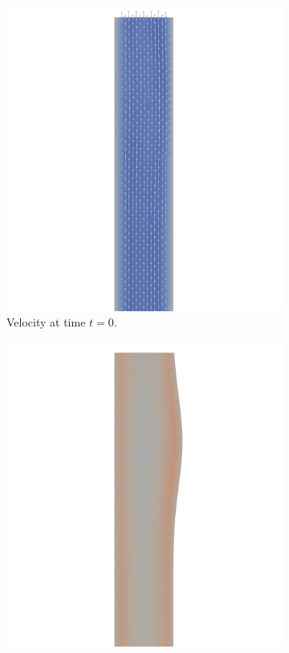 \documentclass[a4paper,11pt,oneside]{book}
\begin{document}
\begin{figure}[h!] 
  \begin{subfigure}[b]{0.5\linewidth}
    \centering
    \includegraphics[width=1.2\linewidth]{images/velocity_30_0.png} 
        \centering
    \caption{Velocity at time $t = 0$.} 
    \label{fig2:a} 
    \vspace{4ex}
  \end{subfigure}%
  \begin{subfigure}[b]{0.5\linewidth}
    \centering
    \includegraphics[width=1.2\linewidth]{images/velocity_30_025.png}

\end{subfigure}
\end{figure}
\end{document}
